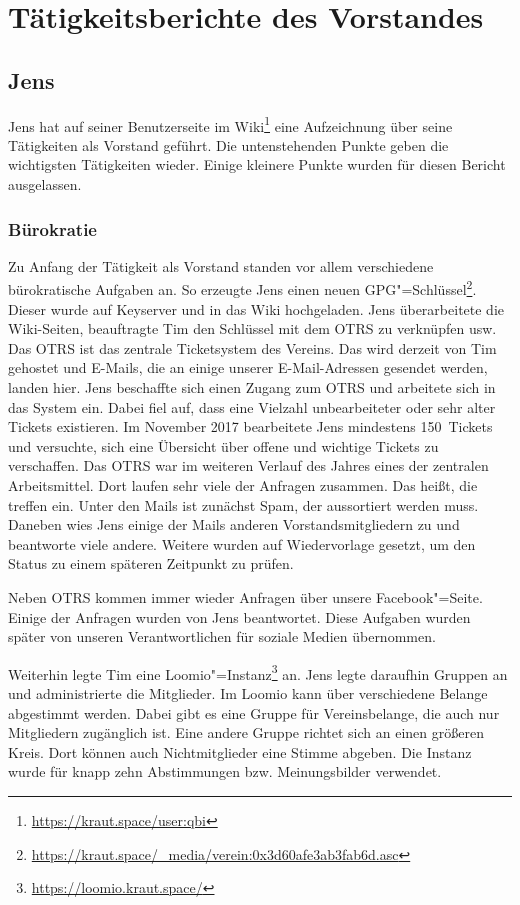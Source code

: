 \documentclass[ngerman]{scrartcl}
\begin{document}
\section{Tätigkeitsberichte des Vorstandes}

\subsection{Jens}

Jens hat auf seiner Benutzerseite im
Wiki\footnote{\url{https://kraut.space/user:qbi}} eine Aufzeichnung über seine
Tätigkeiten als Vorstand geführt. Die untenstehenden Punkte geben die
wichtigsten Tätigkeiten wieder. Einige kleinere Punkte wurden für diesen Bericht
ausgelassen.

\subsubsection{Bürokratie}


Zu Anfang der Tätigkeit als Vorstand standen vor allem verschiedene
bürokratische Aufgaben an. So erzeugte Jens einen neuen
GPG"=Schlüssel\footnote{\url{https://kraut.space/_media/verein:0x3d60afe3ab3fab6d.asc}}. Dieser
wurde auf Keyserver und in das Wiki hochgeladen. Jens überarbeitete die
Wiki-Seiten, beauftragte Tim den Schlüssel mit dem OTRS zu verknüpfen usw. Das
OTRS ist das zentrale Ticketsystem des Vereins. Das wird derzeit von Tim
gehostet und E-Mails, die an einige unserer E-Mail-Adressen gesendet werden,
landen hier. Jens beschaffte sich einen Zugang zum OTRS und arbeitete sich in
das System ein. Dabei fiel auf, dass eine Vielzahl unbearbeiteter oder sehr
alter Tickets existieren. Im November 2017 bearbeitete Jens mindestens
150~Tickets und versuchte, sich eine Übersicht über offene und wichtige Tickets
zu verschaffen. Das OTRS war im weiteren Verlauf des Jahres eines der zentralen
Arbeitsmittel. Dort laufen sehr viele der Anfragen zusammen. Das heißt, die
treffen ein. Unter den Mails ist zunächst Spam, der aussortiert werden
muss. Daneben wies Jens einige der Mails anderen Vorstandsmitgliedern zu und
beantworte viele andere. Weitere wurden auf Wiedervorlage gesetzt, um den Status
zu einem späteren Zeitpunkt zu prüfen.

Neben OTRS kommen immer wieder Anfragen über unsere Facebook"=Seite. Einige der
Anfragen wurden von Jens beantwortet. Diese Aufgaben wurden später von unseren
Verantwortlichen für soziale Medien übernommen.

Weiterhin legte Tim eine
Loomio"=Instanz\footnote{\url{https://loomio.kraut.space/}} an. Jens legte
daraufhin Gruppen an und administrierte die Mitglieder. Im Loomio kann über
verschiedene Belange abgestimmt werden. Dabei gibt es eine Gruppe für
Vereinsbelange, die auch nur Mitgliedern zugänglich ist. Eine andere Gruppe
richtet sich an einen größeren Kreis. Dort können auch Nichtmitglieder eine
Stimme abgeben. Die Instanz wurde für knapp zehn Abstimmungen
bzw. Meinungsbilder verwendet.
\end{document}
